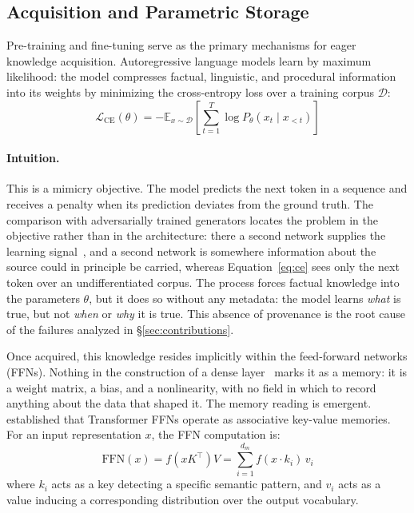 \documentclass[manuscript, screen, review]{jair}
\begin{document}
\subsection{Acquisition and Parametric Storage}
\label{sec:acquisition}
\label{sec:storage}

Pre-training and fine-tuning serve as the primary mechanisms for eager knowledge acquisition. Autoregressive language models learn by maximum likelihood: the model compresses factual, linguistic, and procedural information into its weights by minimizing the cross-entropy loss over a training corpus $\mathcal{D}$:
\begin{equation}
  \label{eq:ce}
  \mathcal{L}_{\text{CE}}(\theta) = -\mathbb{E}_{x \sim \mathcal{D}} \left[ \sum_{t=1}^T \log P_\theta(x_t \mid x_{<t}) \right]
\end{equation}

\paragraph{Intuition.} This is a mimicry objective. The model predicts the next token in a sequence and receives a penalty when its prediction deviates from the ground truth. The comparison with adversarially trained generators locates the problem in the objective rather than in the architecture: there a second network supplies the learning signal~\citep{thakur2021gan}, and a second network is somewhere information about the source could in principle be carried, whereas Equation~\ref{eq:ce} sees only the next token over an undifferentiated corpus. The process forces factual knowledge into the parameters $\theta$, but it does so without any metadata: the model learns \textit{what} is true, but not \textit{when} or \textit{why} it is true. This absence of provenance is the root cause of the failures analyzed in \S\ref{sec:contributions}.

Once acquired, this knowledge resides implicitly within the feed-forward networks (FFNs). Nothing in the construction of a dense layer~\citep{thakur2021fundamentals} marks it as a memory: it is a weight matrix, a bias, and a nonlinearity, with no field in which to record anything about the data that shaped it. The memory reading is emergent. \citet{geva2021kv} established that Transformer FFNs operate as associative key-value memories. For an input representation $x$, the FFN computation is:
\begin{equation}
  \label{eq:ffn}
  \text{FFN}(x) = f(x K^\top)V = \sum_{i=1}^{d_m} f(x \cdot k_i)\, v_i
\end{equation}
where $k_i$ acts as a key detecting a specific semantic pattern, and $v_i$ acts as a value inducing a corresponding distribution over the output vocabulary.
\end{document}
